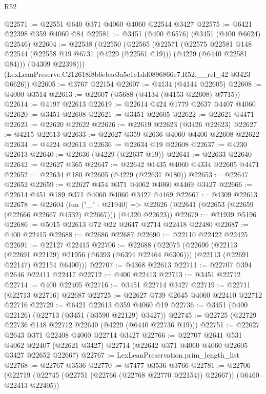 \begin{lexlean}{R52}
\begin{coremodule}
@22571 := @22551 @640 @371 @4060 @4060 @22544 @3427
@22575 := @6421 @22398 @359 @4060 @84
@22581 := @3451 (@400 @6576) (@3451 (@400 @6624) @22546)
@22604 := @22538
    (@22550
      (@22565
        (@22571
          (@22575
            @22581
            @148
            @22544
            (@22558 @19 @6731 (@4229 (@22561 @19)))
            (@4229 (@6440 @22581 @84)))
          (@4309 @22398)))
      (LexLeanPreserve.C212618f8b6ebac3a5c1e1dd0896866e7.R52.__rel_42 @3423 @6626))
@22605 := @3767 @22154
@22607 := @4134 (@4144 @22605)
@22608 := @4000 @3514
@22613 := @22607 (@5688 (@4134 (@4153 @22608) @7715))
@22614 := @4197 @22613
@22619 := @22614 @424 @1779 @2637 @4407 @4060
@22620 := @3451 @22608
@22621 := @3451 @22605
@22622 := @22621 @4471
@22623 := @22620 @22622
@22626 := @22619 @22623 (@3426 @22623)
@22627 := @4215 @22613
@22633 := @22627 @359 @2636 @4060 @4406 @22608 @22622
@22634 := @4224 @22613
@22636 := @22634 @19 @22608
@22637 := @4230 @22613
@22640 := @22636 (@4229 (@22637 @19))
@22641 := @22633 @22640
@22642 := @22627 @365
@22647 := @22642 @1435 @4060 @4334 @22605 @4471
@22652 := @22634 @180 @22605 (@4229 (@22637 @180))
@22653 := @22647 @22652
@22659 := @22627 @454 @371 @4062 @4060 @4469 @3427
@22666 := @22614 @451 @189 @371 @4060 @4060 @3427 @4469
@22667 := @4309 @22613
@22678 := @22604
    (fun ("_" : @21940) =>
    @22626 (@22641 (@22653 (@22659 (@22666 @22667 @4532) @22667))) (@4320 @22623))
@22679 := @21939 @5196
@22686 := @5015 @22613 @72 @22 @2647 @2714 @22418 @22480
@22687 := @400 @22415
@22688 := @22686 @22687
@22690 := @22110 @22422 @22425
@22691 := @22127 @22415
@22706 := @22688
    (@22075
      (@22690
        (@22113 (@22691 @22129) @21956 (@6393 (@6394 @22464 @6306)))
        (@22113 (@22691 @22147) @22154 @6400)))
@22707 := @4368 @22613
@22711 := @22707 @394 @2646 @22411 @22417
@22712 := @400 @22413
@22713 := @3451 @22712
@22714 := @400 @22405
@22716 := @3451 @22714 @3427
@22719 := @22711 (@22713 @22716) @22687
@22725 := @22627 @739 @2645 @4060 @22410 @22712 @22716
@22729 := @6421 @22613 @359 @4060 @19
@22736 := @3451 (@400 @22126) (@22713 (@3451 (@3590 @22129) @3427))
@22745 := @22725 (@22729 @22736 @148 @22712 @22640 (@4229 (@6440 @22736 @19)))
@22751 := @22627 @2643 @371 @22408 @4060 @22714 @3427
@22766 := @22707
    @2641
    @531
    @4062
    @22407
    (@22621 @3427)
    @22714
    (@22642 @371 @4060 @4060 @22605 @3427 @22652 @22667)
@22767 := LexLeanPreservation.prim_length_list
@22768 := @22767 @3536
@22770 := @7477 @3536 @3766
@22781 := @22706
    (@22719 (@22745 (@22751 (@22766 (@22768 @22770 @22154)) @22667)) (@6460 @22413 @22405))

\end{coremodule}
\end{lexlean}
